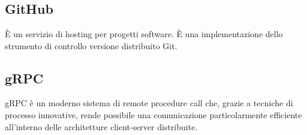 \section{}
\subsection*{GitHub} È un servizio di hosting per progetti software. È una implementazione dello strumento di controllo versione distribuito Git.
\subsection*{gRPC} gRPC è un moderno sistema di remote procedure call che, grazie a tecniche di processo innovative, rende possibile una comunicazione particolarmente efficiente all’interno delle architetture client-server distribuite.
